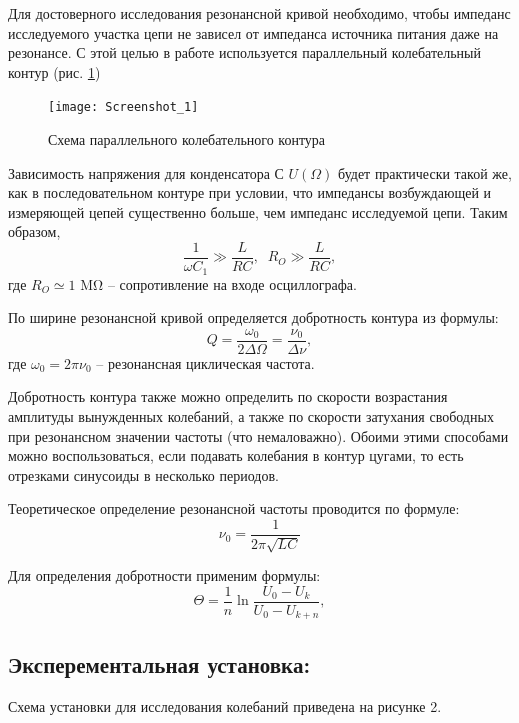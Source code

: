 \documentclass[a4paper,12pt]{article}
\begin{document}
Для достоверного исследования резонансной кривой необходимо, чтобы импеданс исследуемого участка цепи не зависел от импеданса источника питания даже на резонансе. С этой целью в работе используется параллельный колебательный контур (рис. \ref{fig:scheme})
\begin{figure}
	\centering
	\texttt{[image: Screenshot\_1]}
	\caption{Схема параллельного колебательного контура}
	\label{fig:scheme}
\end{figure}
Зависимость напряжения для конденсатора С $ U(\Omega) $ будет практически такой же, как в последовательном контуре при условии, что импедансы возбуждающей и измеряющей цепей существенно больше, чем импеданс исследуемой цепи. Таким образом,
\begin{equation}
	\frac{1}{\omega C_1}\gg \frac{L}{R C}, \; \; R_O \gg \frac{L}{R C},
\end{equation}
где $ R_O \simeq 1$ \si{\mega \ohm} -- сопротивление на входе осциллографа.

По ширине резонансной кривой определяется добротность контура из формулы:
\begin{equation}
	Q = \frac{\omega_0}{2 \Delta \Omega} = \frac{\nu_0}{\Delta \nu},
	\label{eq:main}
\end{equation}
где $ \omega_0 = 2 \pi \nu_0 $ -- резонансная циклическая частота.

Добротность контура также можно определить по скорости возрастания амплитуды вынужденных колебаний, а также по скорости затухания свободных при резонансном значении частоты (что немаловажно). Обоими этими способами можно воспользоваться, если подавать колебания в контур цугами, то есть отрезками синусоиды в несколько периодов. 

Теоретическое определение резонансной частоты проводится по формуле:
\begin{equation}\label{nu}
	\nu_0 = \frac{1}{2 \pi \sqrt{L C}}
\end{equation}

Для определения добротности применим формулы:
\begin{equation}\label{key}
	\Theta = \frac{1}{n} \ln \frac{U_0 - U_k}{U_0 - U_{k+n}},	
\end{equation}



	\subsection{Эксперементальная установка:}
	
	Схема установки для исследования колебаний приведена на рисунке 2. 
 
\end{document}

